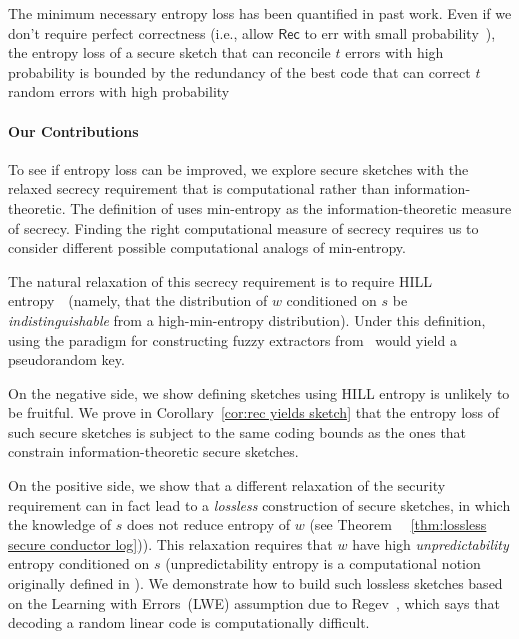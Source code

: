\documentclass[11pt]{article}
\newcommand{\corref}[1]{\mbox{Corollary~\ref{#1}}}
\newcommand{\class}[1]{{\ensuremath{\mathsf{#1}}}}
\newcommand{\rec}{\ensuremath{\class{Rec}}\xspace}
\newcommand{\authnote}[2]{{\textcolor{red}{\textsf{#1 notes: }\textcolor{blue}{ #2}}\marginpar{\textcolor{red}{\textbf{!!!!!}}}}}
\newcommand{\authnote}[2]{}
\newcommand{\lnote}[1]{{\authnote{Leo}{#1}}}
\begin{document}
The minimum necessary  entropy loss has been quantified in past work.  Even if we don't require perfect correctness (i.e., allow $\rec$ to err with small probability~\cite[Section 8]{DBLP:journals/siamcomp/DodisORS08}), the entropy loss of a secure sketch that can reconcile $t$ errors with high probability is bounded by the redundancy of
the best code that can correct $t$ random errors with high probability~\cite[Proposition 8.2]{DBLP:journals/siamcomp/DodisORS08}

\paragraph {Our Contributions}
To see if entropy loss can be improved, we explore secure sketches with the relaxed secrecy requirement that is computational rather than information-theoretic.  The definition of  \cite{DBLP:journals/siamcomp/DodisORS08} uses min-entropy as the information-theoretic measure of secrecy. 
 Finding the right computational measure of secrecy requires us to consider different possible computational analogs of min-entropy.

The natural relaxation of this secrecy requirement is to require HILL entropy~\cite{DBLP:journals/siamcomp/HastadILL99}~(namely, that the distribution of $w$ conditioned on $s$ be \emph{indistinguishable} from a high-min-entropy distribution).  Under this definition, using the paradigm for constructing fuzzy extractors from~\cite{DBLP:journals/siamcomp/DodisORS08} would yield a pseudorandom key.  

On the negative side, we show defining sketches using HILL entropy is unlikely to be fruitful. We prove in \corref{cor:rec yields sketch} that the entropy loss of such secure sketches is subject to the same coding bounds as the ones that constrain information-theoretic secure sketches.

On the positive side, we show that a different relaxation of the security requirement can in fact lead to a \emph{lossless} construction of secure sketches, in which the knowledge of $s$ does not reduce entropy of $w$ (see Theorem~%
~\ref{thm:lossless secure conductor log})).  This relaxation requires that $w$ have high \emph{unpredictability} entropy conditioned on $s$ (unpredictability  entropy is a computational notion originally defined in \cite[Section 5]{DBLP:conf/eurocrypt/HsiaoLR07}).  We demonstrate how to build such lossless sketches based on the Learning with Errors~(LWE) assumption due to Regev~\cite{regev2005LWE, regevLWEsurvey},  which says that decoding a random linear code is computationally difficult. 
\end{document}
